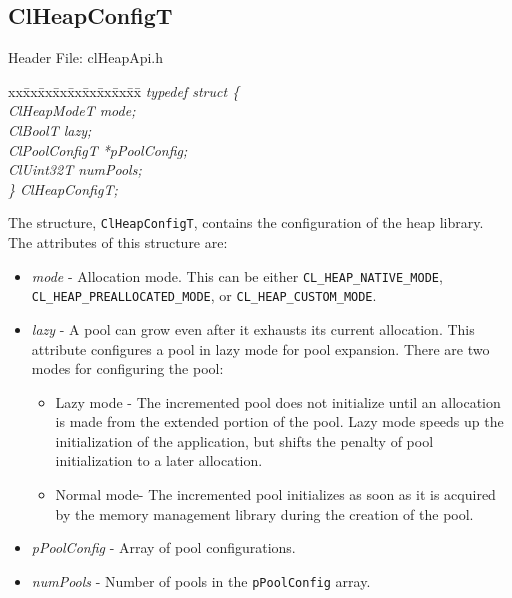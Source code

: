 \begin{flushleft}
\subsection{ClHeapConfigT}
\begin{Desc}
\item[Header File:]clHeapApi.h\end{Desc}
\begin{tabbing}
xx\=xx\=xx\=xx\=xx\=xx\=xx\=xx\=xx\=\kill
\textit{typedef struct \{}\\
\>\>\>\>\textit{ClHeapModeT mode;}\\
\>\>\>\>\textit{ClBoolT lazy;}\\
\>\>\>\>\textit{ClPoolConfigT *pPoolConfig;}\\
\>\>\>\>\textit{ClUint32T numPools;}\\
\textit{\} ClHeapConfigT;}
\end{tabbing} 
The structure, {\tt{ClHeapConfigT}}, contains the configuration of the heap library. The attributes of this structure are:
\begin{itemize}
\item
\textit{mode} - Allocation mode. This can be either {\tt{CL\_\-HEAP\_\-NATIVE\_\-MODE}}, {\tt{CL\_\-HEAP\_\-PREALLOCATED\_\-MODE}}, or 
{\tt{CL\_\-HEAP\_\-CUSTOM\_\-MODE}}.
\item
\textit{lazy} - A pool can grow even after it exhausts its current allocation. This attribute configures a pool in lazy mode for pool expansion. 
There are two modes for configuring the pool:
\begin{itemize}
\item
Lazy mode - The incremented pool does not initialize until an allocation is made from the extended portion of the pool. Lazy mode 
speeds up the initialization of the application, but shifts the penalty of pool initialization to a later allocation.
\item
Normal mode- The incremented pool initializes as soon as it is acquired by the memory management library during the creation of the pool. 
\end{itemize}
\item
\textit{pPoolConfig} - Array of pool configurations.
\item
\textit{numPools} - Number of pools in the {\tt{pPoolConfig}} array.
\end{itemize}



\end{flushleft}
